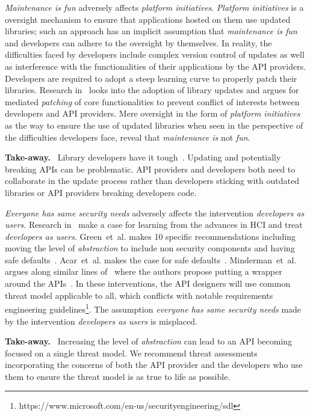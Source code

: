 \documentclass[conference]{IEEEtran}
\newenvironment{finding}{\begin{framed}\noindent\textbf{Take-away.}~}{\end{framed}}
\newcommand{\etal}[0]{et~al{.}}
\begin{document}
\emph{Maintenance is fun} adversely affects \emph{platform initiatives}. \emph{Platform initiatives} is a oversight mechanism to ensure that applications hosted on them use updated libraries; such an approach has an implicit assumption that \emph{maintenance is fun} and developers can adhere to the oversight by themselves. In reality, the difficulties faced by developers include complex version control of updates as well as interference with the functionalities of their applications by the API providers. Developers are required to adopt a steep learning curve to properly patch their libraries. Research in~\cite{erikacar2017} looks into the adoption of library updates and argues for mediated \emph{patching} of core functionalities to prevent conflict of interests between developers and API providers. Mere oversight in the form of \emph{platform initiatives} as the way to ensure the use of updated libraries when seen in the perspective of the difficulties developers face, reveal that \emph{maintenance is} not \emph{fun}.
\begin{finding}
\noindent
Library developers have it tough~\cite{hartman2021nontechnical}. 
Updating and potentially breaking APIs can be problematic.
API providers and developers both need to collaborate in the update process rather than developers sticking with outdated libraries or API providers breaking developers code.  
\end{finding}

\emph{Everyone has same security needs} adversely affects the intervention \emph{developers as users}. Research in~\cite{rashid2019,acar2016} make a case for learning from the advances in \ac{HCI} and treat \emph{developers as users}. Green~\etal{} makes 10 specific recommendations including moving the level of \emph{abstraction} to include non security components and having safe defaults~\cite{smithgreen2016}. Acar~\etal{} makes the case for safe defaults~\cite{acarusability2017}. Minderman~\etal{} argues along similar lines of~\cite{smithgreen2016,acar2016} where the authors propose putting a wrapper around the APIs~\cite{mindermanrust2018}. In these interventions, the API designers will use common threat model applicable to all, which conflicts with notable requirements engineering guidelines\footnote{https://www.microsoft.com/en-us/securityengineering/sdl}. The assumption \emph{everyone has same security needs} made by the intervention \emph{developers as users} is misplaced.  
\begin{finding}
\noindent  
Increasing the level of \emph{abstraction} can lead to an API becoming focused on a single  threat model. We recommend threat assessments incorporating the concerns of both the API provider and the developers who use them to ensure the threat model is as true to life as possible.
\end{finding}
%
\end{document}
